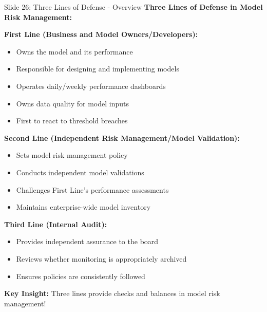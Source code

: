 \documentclass[8pt]{beamer}
\begin{document}
	\begin{frame}{Slide 26: Three Lines of Defense - Overview}
		\fontsize{6.5}{7.5}\selectfont
		\textbf{Three Lines of Defense in Model Risk Management:}
		
		\vspace{0.1cm}
		\textbf{First Line (Business and Model Owners/Developers):}
		\begin{itemize}
			\item Owns the model and its performance
			\item Responsible for designing and implementing models
			\item Operates daily/weekly performance dashboards
			\item Owns data quality for model inputs
			\item First to react to threshold breaches
		\end{itemize}
		
		\vspace{0.1cm}
		\textbf{Second Line (Independent Risk Management/Model Validation):}
		\begin{itemize}
			\item Sets model risk management policy
			\item Conducts independent model validations
			\item Challenges First Line's performance assessments
			\item Maintains enterprise-wide model inventory
		\end{itemize}
		
		\vspace{0.1cm}
		\textbf{Third Line (Internal Audit):}
		\begin{itemize}
			\item Provides independent assurance to the board
			\item Reviews whether monitoring is appropriately archived
			\item Ensures policies are consistently followed
		\end{itemize}
		
		\textcolor{myblue}{\textbf{Key Insight:}} Three lines provide \textcolor{myblue}{checks and balances in model risk management}!
	\end{frame}
	
\end{document}
